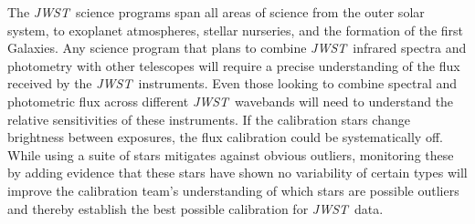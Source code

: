 \documentclass[letterpaper,12pt]{article}
\newcommand{\jwst}{{\it JWST}}
\begin{document}
The \jwst\ science programs span all areas of science from the outer solar system, to exoplanet atmospheres, stellar nurseries, and the formation of the first Galaxies. Any science program that plans to combine \jwst\ infrared spectra and photometry with other telescopes will require a precise understanding of the flux received by the \jwst\ instruments. Even those looking to combine spectral and photometric flux across different \jwst\ wavebands will need to understand the relative sensitivities of these instruments. If the calibration stars change brightness between exposures, the flux calibration could be systematically off. While using a suite of stars mitigates against obvious outliers, monitoring these  by adding evidence that these stars have shown no variability of certain types will improve the calibration team's understanding of which stars are possible outliers and thereby establish the best possible calibration for \jwst\ data.  


\end{document}
